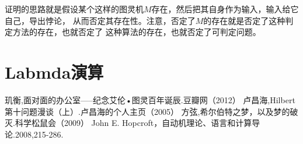 \documentclass[12pt,a4paper,oneside]{ctexrep}
\theoremstyle{definition}
\begin{document}
证明的思路就是假设某个这样的图灵机$M$存在，然后把其自身作为输入，输入给它自己，导出悖论，
从而否定其存在性。注意，否定了$M$的存在就是否定了这种判定方法的存在，也就否定了
这种算法的存在，也就否定了可判定问题。

\chapter{Labmda演算}




\begin{thebibliography}{99}
 玑衡,面对面的办公室-----纪念艾伦•图灵百年诞辰.豆瓣网（2012）
 卢昌海,Hilbert第十问题漫谈（上）.卢昌海的个人主页（2005）
 方弦,希尔伯特之梦，以及梦的破灭.科学松鼠会（2009）
 John E. Hopcroft，自动机理论、语言和计算导论.2008,215-286.
\end{thebibliography}
\end{document}
